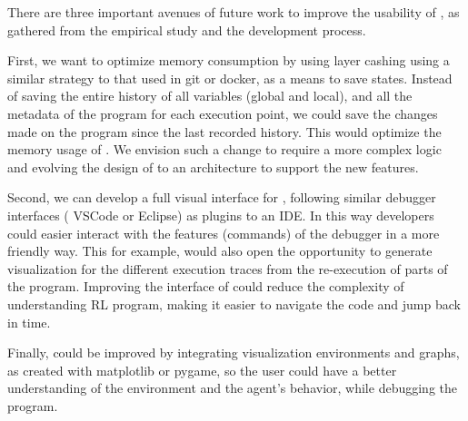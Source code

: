 There are three important avenues of future work to improve the usability of \flik, as gathered from the 
empirical study and the development process. 

First, we want to optimize memory consumption by using layer cashing using a similar strategy to that 
used in git or docker, as a means to save states. Instead of saving the entire history of all variables 
(global and local), and all the metadata of the program for each execution point, we could 
save the changes made on the program since the last recorded history. This would optimize the 
memory usage of \flik. We envision such a change to require a more complex logic and evolving the 
design of \flik to an architecture to support the new features. 

Second, we can develop a full visual interface for \flik, following similar debugger interfaces (\eg 
VSCode or Eclipse) as plugins to an IDE. In this way developers could easier interact with the features 
(commands) of the debugger in a more friendly way. This for example, would also open the opportunity 
to generate visualization for the different execution traces from the re-execution of parts of the program.
Improving the interface of \flik could reduce the complexity of understanding \ac{RL} program,
making it easier to navigate the code and jump back in time.

Finally, \flik could be improved by integrating visualization environments and graphs, as created with 
matplotlib or pygame, so the user could have a better understanding of the environment and the 
agent's behavior, while debugging the program.


\endinput
